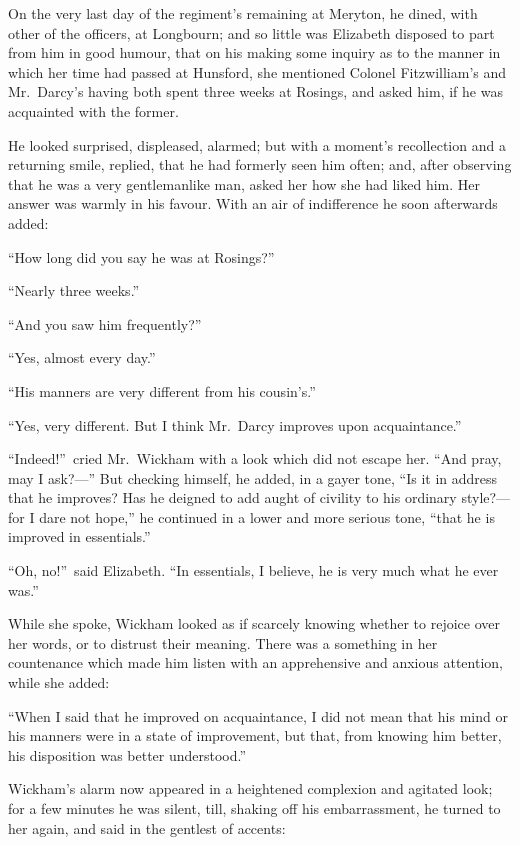 \documentclass[12pt,english]{book}
\begin{document}
On the very last day of the regiment's remaining at Meryton, he dined,
with other of the officers, at Longbourn; and so little was Elizabeth
disposed to part from him in good humour, that on his making some
inquiry as to the manner in which her time had passed at Hunsford,
she mentioned Colonel Fitzwilliam's and Mr.\ Darcy's having both
spent three weeks at Rosings, and asked him, if he was acquainted
with the former.

He looked surprised, displeased, alarmed; but with a moment's recollection
and a returning smile, replied, that he had formerly seen him often;
and, after observing that he was a very gentlemanlike man, asked her
how she had liked him. Her answer was warmly in his favour. With an
air of indifference he soon afterwards added:

{}``How long did you say he was at Rosings?''\ 

{}``Nearly three weeks.''

{}``And you saw him frequently?''\ 

{}``Yes, almost every day.''

{}``His manners are very different from his cousin's.''

{}``Yes, very different. But I think Mr.\ Darcy improves upon acquaintance.''

{}``Indeed!''\ cried Mr.\ Wickham with a look which did not escape
her. {}``And pray, may I ask?\mbox{---}'' But checking himself,
he added, in a gayer tone, {}``Is it in address that he improves?
Has he deigned to add aught of civility to his ordinary style?\mbox{---}for
I dare not hope,'' he continued in a lower and more serious tone,
{}``that he is improved in essentials.''

{}``Oh, no!''\ said Elizabeth. {}``In essentials, I believe, he
is very much what he ever was.''

While she spoke, Wickham looked as if scarcely knowing whether to
rejoice over her words, or to distrust their meaning. There was a
something in her countenance which made him listen with an apprehensive
and anxious attention, while she added:

{}``When I said that he improved on acquaintance, I did not mean
that his mind or his manners were in a state of improvement, but that,
from knowing him better, his disposition was better understood.''

Wickham's alarm now appeared in a heightened complexion and agitated
look; for a few minutes he was silent, till, shaking off his embarrassment,
he turned to her again, and said in the gentlest of accents:
\end{document}
